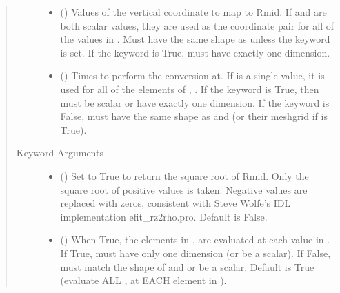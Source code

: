 \documentclass[letterpaper,10pt,english]{sphinxmanual}
\begin{document}
\begin{fulllineitems}
\begin{fulllineitems}
\begin{quote}
\begin{description}
\begin{itemize}
\item {} 
 () \textendash{} Values of the vertical coordinate to
map to Rmid. If  and  are both scalar values,
they are used as the coordinate pair for all of the values in
. Must have the same shape as  unless the 
keyword is set. If the  keyword is True,  must
have exactly one dimension.

\item {} 
 () \textendash{} Times to perform the conversion at.
If  is a single value, it is used for all of the elements of
, . If the  keyword is True, then  must be
scalar or have exactly one dimension. If the  keyword is
False,  must have the same shape as  and  (or their
meshgrid if  is True).

\end{itemize}

\item[{Keyword Arguments}] \leavevmode\begin{itemize}
\item {} 
 () \textendash{} Set to True to return the square root of Rmid.
Only the square root of positive values is taken. Negative
values are replaced with zeros, consistent with Steve Wolfe’s
IDL implementation efit\_rz2rho.pro. Default is False.

\item {} 
 () \textendash{} When True, the elements in ,  are evaluated
at each value in . If True,  must have only one dimension
(or be a scalar). If False,  must match the shape of  and
 or be a scalar. Default is True (evaluate ALL ,  at
EACH element in ).


\end{itemize}
\end{description}
\end{quote}
\end{fulllineitems}
\end{fulllineitems}
\end{document}
